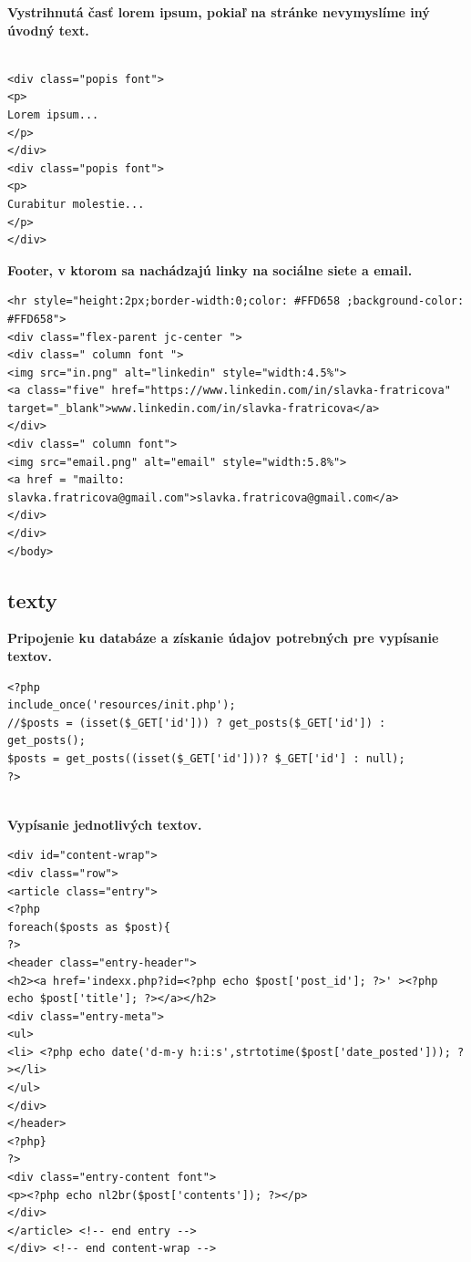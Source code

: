 \vspace{0.5cm}
\textbf{Vystrihnutá časť lorem ipsum, pokiaľ na stránke nevymyslíme iný úvodný text.}
\vspace{0.5cm}
\begin{lstlisting}

<div class="popis font">
<p>
Lorem ipsum...
</p>
</div>
<div class="popis font">
<p>
Curabitur molestie...
</p>
</div>

\end{lstlisting}
\vspace{0.5cm}
\textbf{Footer, v ktorom sa nachádzajú linky na sociálne siete a email. }
\vspace{0.5cm}
\begin{lstlisting}
<hr style="height:2px;border-width:0;color: #FFD658 ;background-color: #FFD658">
<div class="flex-parent jc-center ">
<div class=" column font ">
<img src="in.png" alt="linkedin" style="width:4.5%">
<a class="five" href="https://www.linkedin.com/in/slavka-fratricova" target="_blank">www.linkedin.com/in/slavka-fratricova</a>
</div>
<div class=" column font">
<img src="email.png" alt="email" style="width:5.8%">
<a href = "mailto: slavka.fratricova@gmail.com">slavka.fratricova@gmail.com</a>
</div>
</div>
</body>
\end{lstlisting}

\subsection{texty}
\vspace{0.5cm}
\textbf{Pripojenie ku databáze a získanie údajov potrebných pre vypísanie textov.}
\vspace{0.5cm}
\begin{lstlisting}
<?php
include_once('resources/init.php');
//$posts = (isset($_GET['id'])) ? get_posts($_GET['id']) : get_posts();
$posts = get_posts((isset($_GET['id']))? $_GET['id'] : null);
?>


\end{lstlisting}
\vspace{0.5cm}
\textbf{Vypísanie jednotlivých textov.}
\vspace{0.5cm}
\begin{lstlisting}
<div id="content-wrap">
<div class="row">
<article class="entry">
<?php
foreach($posts as $post){
?>
<header class="entry-header">
<h2><a href='indexx.php?id=<?php echo $post['post_id']; ?>' ><?php echo $post['title']; ?></a></h2>						
<div class="entry-meta">
<ul>
<li> <?php echo date('d-m-y h:i:s',strtotime($post['date_posted'])); ?></li>
</ul>
</div>
</header>
<?php}
?>
<div class="entry-content font">
<p><?php echo nl2br($post['contents']); ?></p>
</div>	
</article> <!-- end entry -->
</div> <!-- end content-wrap -->
\end{lstlisting}


